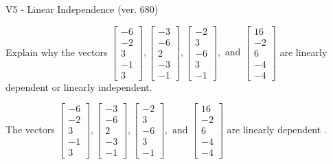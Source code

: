 \begin{exercise}
  \begin{exerciseTitle}V5 - Linear Independence (ver. 680)\end{exerciseTitle}
  \begin{exerciseStatement}
    Explain why the vectors \(\left[\begin{array}{r}
-6 \\
-2 \\
3 \\
-1 \\
3
\end{array}\right] , \left[\begin{array}{r}
-3 \\
-6 \\
2 \\
-3 \\
-1
\end{array}\right] , \left[\begin{array}{r}
-2 \\
3 \\
-6 \\
3 \\
-1
\end{array}\right] , \text{ and } \left[\begin{array}{r}
16 \\
-2 \\
6 \\
-4 \\
-4
\end{array}\right]\) are linearly dependent or linearly independent.	


  \end{exerciseStatement}
  \begin{exerciseAnswer}
   The vectors \(\left[\begin{array}{r}
-6 \\
-2 \\
3 \\
-1 \\
3
\end{array}\right] , \left[\begin{array}{r}
-3 \\
-6 \\
2 \\
-3 \\
-1
\end{array}\right] , \left[\begin{array}{r}
-2 \\
3 \\
-6 \\
3 \\
-1
\end{array}\right] , \text{ and } \left[\begin{array}{r}
16 \\
-2 \\
6 \\
-4 \\
-4
\end{array}\right]\) are 
  	 linearly dependent  .
  


  \end{exerciseAnswer}
\end{exercise}